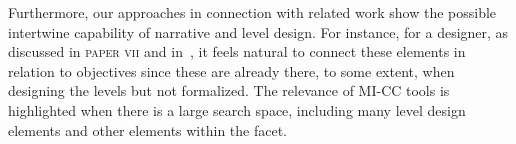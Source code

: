 Furthermore, our approaches in connection with related work show the possible intertwine capability of narrative and level design. For instance, for a designer, as discussed in \textsc{paper vii} and in~\cite{larsson_queststories_2021}, it feels natural to connect these elements in relation to objectives since these are already there, to some extent, when designing the levels but not formalized. The relevance of MI-CC tools is highlighted when there is a large search space, including many level design elements and other elements within the facet.









